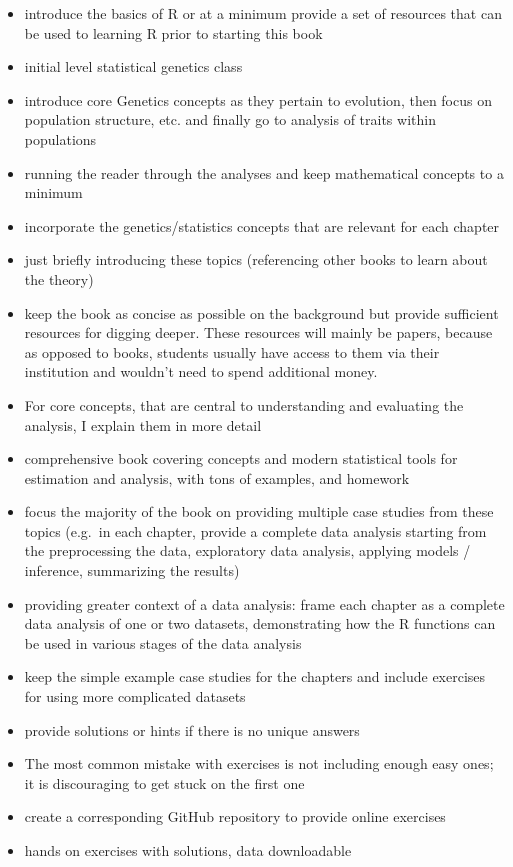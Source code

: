 \documentclass[12pt,]{krantz}
\begin{document}
\begin{itemize}
\item
  introduce the basics of R or at a minimum provide a set of resources
  that can be used to learning R prior to starting this book
\item
  initial level statistical genetics class
\item
  introduce core Genetics concepts as they pertain to evolution, then
  focus on population structure, etc. and finally go to analysis of
  traits within populations
\item
  running the reader through the analyses and keep mathematical concepts
  to a minimum
\item
  incorporate the genetics/statistics concepts that are relevant for
  each chapter
\item
  just briefly introducing these topics (referencing other books to
  learn about the theory)
\item
  keep the book as concise as possible on the background but provide
  sufficient resources for digging deeper. These resources will mainly
  be papers, because as opposed to books, students usually have access
  to them via their institution and wouldn't need to spend additional
  money.
\item
  For core concepts, that are central to understanding and evaluating
  the analysis, I explain them in more detail
\item
  comprehensive book covering concepts and modern statistical tools for
  estimation and analysis, with tons of examples, and homework
\item
  focus the majority of the book on providing multiple case studies from
  these topics (e.g.~in each chapter, provide a complete data analysis
  starting from the preprocessing the data, exploratory data analysis,
  applying models / inference, summarizing the results)
\item
  providing greater context of a data analysis: frame each chapter as a
  complete data analysis of one or two datasets, demonstrating how the R
  functions can be used in various stages of the data analysis
\item
  keep the simple example case studies for the chapters and include
  exercises for using more complicated datasets
\item
  provide solutions or hints if there is no unique answers
\item
  The most common mistake with exercises is not including enough easy
  ones; it is discouraging to get stuck on the first one
\item
  create a corresponding GitHub repository to provide online exercises
\item
  hands on exercises with solutions, data downloadable
\end{itemize}
\end{document}
